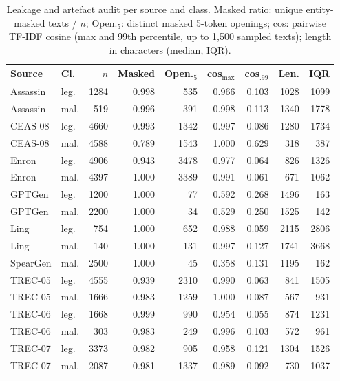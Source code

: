 \begin{table}[t]
\centering
\caption{Leakage and artefact audit per source and class. Masked ratio: unique entity-masked texts / $n$; Open.$_5$: distinct masked 5-token openings; cos: pairwise TF-IDF cosine (max and 99th percentile, up to 1{,}500 sampled texts); length in characters (median, IQR).}
\label{tab:audit}
\scriptsize
\setlength{\tabcolsep}{2.2pt}
\begin{tabular}{@{}llrrrrrrr@{}}
\toprule
Source & Cl. & $n$ & Masked & Open.$_5$ & cos$_{\max}$ & cos$_{.99}$ & Len. & IQR \\
\midrule
Assassin & leg. & 1284 & 0.998 & 535 & 0.966 & 0.103 & 1028 & 1099 \\
Assassin & mal. & 519 & 0.996 & 391 & 0.998 & 0.113 & 1340 & 1778 \\
CEAS-08 & leg. & 4660 & 0.993 & 1342 & 0.997 & 0.086 & 1280 & 1734 \\
CEAS-08 & mal. & 4588 & 0.789 & 1543 & 1.000 & 0.629 & 318 & 387 \\
Enron & leg. & 4906 & 0.943 & 3478 & 0.977 & 0.064 & 826 & 1326 \\
Enron & mal. & 4397 & 1.000 & 3389 & 0.991 & 0.061 & 671 & 1062 \\
GPTGen & leg. & 1200 & 1.000 & 77 & 0.592 & 0.268 & 1496 & 163 \\
GPTGen & mal. & 2200 & 1.000 & 34 & 0.529 & 0.250 & 1525 & 142 \\
Ling & leg. & 754 & 1.000 & 652 & 0.988 & 0.059 & 2115 & 2806 \\
Ling & mal. & 140 & 1.000 & 131 & 0.997 & 0.127 & 1741 & 3668 \\
SpearGen & mal. & 2500 & 1.000 & 45 & 0.358 & 0.131 & 1195 & 162 \\
TREC-05 & leg. & 4555 & 0.939 & 2310 & 0.990 & 0.063 & 841 & 1505 \\
TREC-05 & mal. & 1666 & 0.983 & 1259 & 1.000 & 0.087 & 567 & 931 \\
TREC-06 & leg. & 1668 & 0.999 & 990 & 0.954 & 0.055 & 874 & 1231 \\
TREC-06 & mal. & 303 & 0.983 & 249 & 0.996 & 0.103 & 572 & 961 \\
TREC-07 & leg. & 3373 & 0.982 & 905 & 0.958 & 0.121 & 1304 & 1526 \\
TREC-07 & mal. & 2087 & 0.981 & 1337 & 0.989 & 0.092 & 730 & 1037 \\
\bottomrule
\end{tabular}
\end{table}
